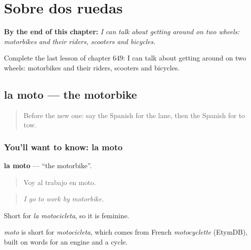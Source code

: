 
\chapter{Sobre dos ruedas}
\label{ch:es-sobre-dos-ruedas}

\begin{chapteropening}
\textbf{By the end of this chapter:} \emph{I can talk about getting around on two wheels: motorbikes and their riders, scooters and bicycles.}

Complete the last lesson of chapter 649: I can talk about getting around on two wheels: motorbikes and their riders, scooters and bicycles.
\end{chapteropening}

\section[la moto]{la moto — the motorbike}

\label{lesson:ES-C649-moto}



\begin{quote}
Before the new one: say the Spanish for the lane, then the Spanish for to tow.
\end{quote}

\subsection*{You'll want to know: la moto}
\textbf{la moto} — \textquotedblleft{}the motorbike\textquotedblright{}.

\begin{quote}
Voy al trabajo en moto.
\end{quote}

\begin{quote}
\emph{I go to work by motorbike.}
\end{quote}

Short for \emph{la motocicleta}, so it is feminine.

\begin{cousinweb}
\emph{moto} is short for \emph{motocicleta}, which comes from French \emph{motocyclette} (EtymDB), built on words for an engine and a cycle.
\end{cousinweb}

